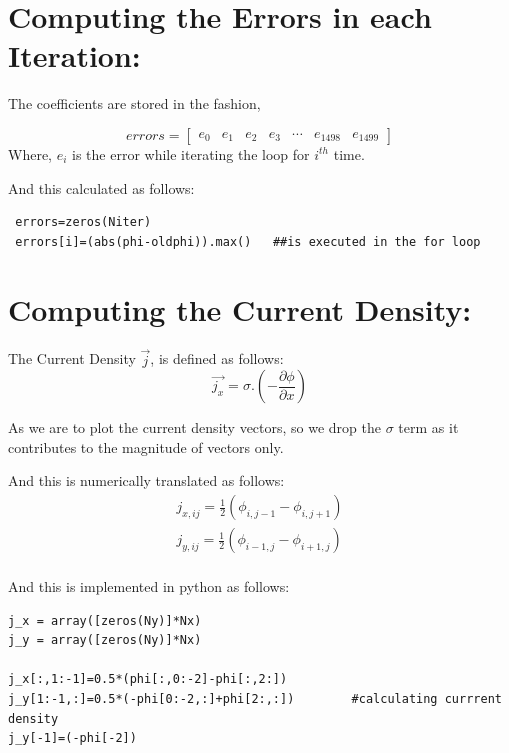 \documentclass[10pt,english, openany]{book}
\begin{document}
\section{Computing the Errors in each Iteration:}

The coefficients are stored in the fashion,\par 
\begin{equation*}
errors=\begin{bmatrix} 
e_0 & e_1 & e_2 & e_3 &\cdots & e_{1498} &  e_{1499}
 \end{bmatrix}
 \end{equation*}
 Where, $e_i$ is the error while iterating the loop for $i^{th}$ time.\par
 And this calculated as follows:
 \begin{verbatim}
 errors=zeros(Niter)
 errors[i]=(abs(phi-oldphi)).max()   ##is executed in the for loop
 \end{verbatim}
 \par
 
\section{Computing the Current Density:}

The Current Density $\vec{j}$, is defined as follows:
\begin{equation*}
\vec{j_x} = \sigma . (-\frac{\partial \phi}{\partial x})
\end{equation*}

As we are to plot the current density vectors, so we drop the $\sigma$ term as it contributes to the magnitude of vectors only.

And this is numerically translated as follows:
\begin{align*}
j_{x,ij}=\frac{1}{2} (\phi_{i,j-1}-\phi_{i,j+1}) \\
j_{y,ij}=\frac{1}{2} (\phi_{i-1,j}-\phi_{i+1,j})\\
\end{align*}


And this is implemented in python as follows:
\begin{verbatim}
j_x = array([zeros(Ny)]*Nx)
j_y = array([zeros(Ny)]*Nx)

j_x[:,1:-1]=0.5*(phi[:,0:-2]-phi[:,2:])
j_y[1:-1,:]=0.5*(-phi[0:-2,:]+phi[2:,:])		#calculating currrent density
j_y[-1]=(-phi[-2])
\end{verbatim}
\newpage 
\end{document}
